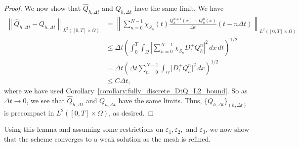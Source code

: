 \documentclass[10pt,letterpaper]{amsart}
\theoremstyle{definition}{\newtheorem{definition}[lemma]{Definition}}
\theoremstyle{note}{\newtheorem{claim}{Claim}[section]
\newtheorem*{claim*}{Claim}}
\numberwithin{equation}{section}
\begin{document}
\begin{proof}
We now show that $\widehat{Q}_{h,\Delta t}$ and $Q_{h,\Delta t}$ have the same limit. We have
\begin{align*}
    \left\|\widehat{Q}_{h,\Delta t} - Q_{h,\Delta t}\right\|_{L^2([0,T]\times\Omega)}
        &= \left\|\sum_{n=0}^{N-1}\chi_{S_n}(t)\frac{Q_h^{n+1}(x) - Q_h^n(x)}{\Delta t}(t - n\Delta t)\right\|_{L^2([0,T]\times\Omega)}\\
        &\le \Delta t\left(\int_0^T\int_\Omega \left\lvert \sum_{n=0}^{N-1}\chi_{S_n} D_t^+ Q_h^n\right\rvert^2\, dx\, dt\right)^{1/2}\\
        &= \Delta t\left(\Delta t\sum_{n=0}^{N-1}\int_\Omega \lvert D_t^+ Q_h^n\rvert^2\, dx\right)^{1/2}\\
        &\le C\Delta t,
\end{align*}
where we have used Corollary~\ref{corollary:fully_discrete_DtQ_L2_bound}. So as $\Delta t\to 0$, we see that $\widehat{Q}_{h,\Delta t}$ and $Q_{h,\Delta t}$ have the same limits. Thus, $\{Q_{h,\Delta t}\}_{(h,\Delta t)}$ is precompact in $L^2([0,T]\times\Omega)$, as desired.
\end{proof}

Using this lemma and assuming some restrictions on $\varepsilon_1,\varepsilon_2,$ and $\varepsilon_3$, we now show that the scheme converges to a weak solution as the mesh is refined.
\end{document}
